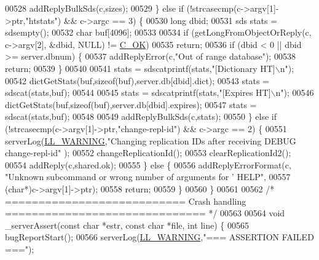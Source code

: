 \begin{DoxyCode}
{{{{{{{{{{{{{{{{{{{{{{{{{00528         addReplyBulkSds(c,sizes);
00529     \} \textcolor{keywordflow}{else} \textcolor{keywordflow}{if} (!strcasecmp(c->argv[1]->ptr,\textcolor{stringliteral}{"htstats"}) && c->argc == 3) \{
00530         \textcolor{keywordtype}{long} dbid;
00531         sds stats = sdsempty();
00532         \textcolor{keywordtype}{char} buf[4096];
00533 
00534         \textcolor{keywordflow}{if} (getLongFromObjectOrReply(c, c->argv[2], &dbid, NULL) != \hyperlink{server_8h_a303769ef1065076e68731584e758d3e1}{C\_OK})
00535             \textcolor{keywordflow}{return};
00536         \textcolor{keywordflow}{if} (dbid < 0 || dbid >= server.dbnum) \{
00537             addReplyError(c,\textcolor{stringliteral}{"Out of range database"});
00538             \textcolor{keywordflow}{return};
00539         \}
00540 
00541         stats = sdscatprintf(stats,\textcolor{stringliteral}{"[Dictionary HT]\(\backslash\)n"});
00542         dictGetStats(buf,\textcolor{keyword}{sizeof}(buf),server.db[dbid].dict);
00543         stats = sdscat(stats,buf);
00544 
00545         stats = sdscatprintf(stats,\textcolor{stringliteral}{"[Expires HT]\(\backslash\)n"});
00546         dictGetStats(buf,\textcolor{keyword}{sizeof}(buf),server.db[dbid].expires);
00547         stats = sdscat(stats,buf);
00548 
00549         addReplyBulkSds(c,stats);
00550     \} \textcolor{keywordflow}{else} \textcolor{keywordflow}{if} (!strcasecmp(c->argv[1]->ptr,\textcolor{stringliteral}{"change-repl-id"}) && c->argc == 2) \{
00551         serverLog(\hyperlink{server_8h_a31229b9334bba7d6be2a72970967a14b}{LL\_WARNING},\textcolor{stringliteral}{"Changing replication IDs after receiving DEBUG change-repl-id"}
      );
00552         changeReplicationId();
00553         clearReplicationId2();
00554         addReply(c,shared.ok);
00555     \} \textcolor{keywordflow}{else} \{
00556         addReplyErrorFormat(c, \textcolor{stringliteral}{"Unknown subcommand or wrong number of arguments for '%
       HELP"},
00557             (\textcolor{keywordtype}{char}*)c->argv[1]->ptr);
00558         \textcolor{keywordflow}{return};
00559     \}
00560 \}
00561 
00562 \textcolor{comment}{/* =========================== Crash handling  ============================== */}
00563 
00564 \textcolor{keywordtype}{void} \_serverAssert(\textcolor{keyword}{const} \textcolor{keywordtype}{char} *estr, \textcolor{keyword}{const} \textcolor{keywordtype}{char} *file, \textcolor{keywordtype}{int} line) \{
00565     bugReportStart();
00566     serverLog(\hyperlink{server_8h_a31229b9334bba7d6be2a72970967a14b}{LL\_WARNING},\textcolor{stringliteral}{"=== ASSERTION FAILED ==="});
}}}}}}}}}}}}}}}}}}}}}}}}}
\end{DoxyCode}
